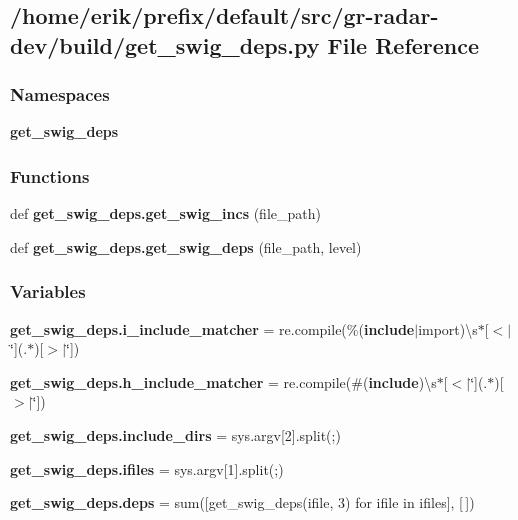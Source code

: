 \subsection{/home/erik/prefix/default/src/gr-\/radar-\/dev/build/get\+\_\+swig\+\_\+deps.py File Reference}
\label{get__swig__deps_8py}
\subsubsection*{Namespaces}
\begin{DoxyCompactItemize}
\item 
 {\bf get\+\_\+swig\+\_\+deps}
\end{DoxyCompactItemize}
\subsubsection*{Functions}
\begin{DoxyCompactItemize}
\item 
def {\bf get\+\_\+swig\+\_\+deps.\+get\+\_\+swig\+\_\+incs} (file\+\_\+path)
\item 
def {\bf get\+\_\+swig\+\_\+deps.\+get\+\_\+swig\+\_\+deps} (file\+\_\+path, level)
\end{DoxyCompactItemize}
\subsubsection*{Variables}
\begin{DoxyCompactItemize}
\item 
{\bf get\+\_\+swig\+\_\+deps.\+i\+\_\+include\+\_\+matcher} = re.\+compile(\textquotesingle{}\%({\bf include}$\vert$import)\textbackslash{}s$\ast$[$<$$\vert$\char`\"{}](.$\ast$)[$>$$\vert$\char`\"{}]\textquotesingle{})
\item 
{\bf get\+\_\+swig\+\_\+deps.\+h\+\_\+include\+\_\+matcher} = re.\+compile(\textquotesingle{}\#({\bf include})\textbackslash{}s$\ast$[$<$$\vert$\char`\"{}](.$\ast$)[$>$$\vert$\char`\"{}]\textquotesingle{})
\item 
{\bf get\+\_\+swig\+\_\+deps.\+include\+\_\+dirs} = sys.\+argv[2].split(\textquotesingle{};\textquotesingle{})
\item 
{\bf get\+\_\+swig\+\_\+deps.\+ifiles} = sys.\+argv[1].split(\textquotesingle{};\textquotesingle{})
\item 
{\bf get\+\_\+swig\+\_\+deps.\+deps} = sum([get\+\_\+swig\+\_\+deps(ifile, 3) for ifile in ifiles], [$\,$])
\end{DoxyCompactItemize}
